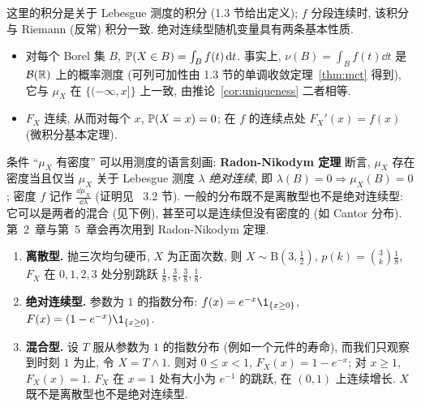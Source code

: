 这里的积分是关于 Lebesgue 测度的积分 (1.3 节给出定义); $f$ 分段连续时, 该积分与 Riemann (反常) 积分一致. 绝对连续型随机变量具有两条基本性质.
\begin{itemize}
\item 对每个 Borel 集 $B$, $\P(X\in B)=\int_B f(t)\dd t$. 事实上, $\nu(B)=\int_B f(t)\dd t$ 是 $\mathcal{B}(\R)$ 上的概率测度 (可列可加性由 1.3 节的单调收敛定理~\ref{thm:mct} 得到), 它与 $\mu_X$ 在 $\{(-\infty,x]\}$ 上一致, 由推论~\ref{cor:uniqueness} 二者相等.
\item $F_X$ 连续, 从而对每个 $x$, $\P(X=x)=0$; 在 $f$ 的连续点处 $F_X'(x)=f(x)$ (微积分基本定理).
\end{itemize}

\begin{remark}
条件 ``$\mu_X$ 有密度'' 可以用测度的语言刻画: \textbf{Radon-Nikodym 定理} 断言, $\mu_X$ 存在密度当且仅当 $\mu_X$ 关于 Lebesgue 测度 $\lambda$ \emph{绝对连续}, 即 $\lambda(B)=0\Rightarrow\mu_X(B)=0$; 密度 $f$ 记作 $\frac{\dd\mu_X}{\dd\lambda}$ (证明见~\cite{folland} 3.2 节). 一般的分布既不是离散型也不是绝对连续型: 它可以是两者的混合 (见下例), 甚至可以是连续但没有密度的 (如 Cantor 分布). 第~2~章与第~5~章会再次用到 Radon-Nikodym 定理.
\end{remark}

\begin{example}\label{ex:cdf-types}
\begin{enumerate}
\item \textbf{离散型.} 抛三次均匀硬币, $X$ 为正面次数, 则 $X\sim\mathrm{B}(3,\frac{1}{2})$, $p(k)=\binom{3}{k}\frac{1}{8}$, $F_X$ 在 $0,1,2,3$ 处分别跳跃 $\frac{1}{8},\frac{3}{8},\frac{3}{8},\frac{1}{8}$.
\item \textbf{绝对连续型.} 参数为 $1$ 的指数分布: $f(x)=e^{-x}\1_{\{x\ge0\}}$, $F(x)=(1-e^{-x})\1_{\{x\ge0\}}$.
\item \textbf{混合型.} 设 $T$ 服从参数为 $1$ 的指数分布 (例如一个元件的寿命), 而我们只观察到时刻 $1$ 为止, 令 $X=T\wedge1$. 则对 $0\le x<1$, $F_X(x)=1-e^{-x}$; 对 $x\ge1$, $F_X(x)=1$. $F_X$ 在 $x=1$ 处有大小为 $e^{-1}$ 的跳跃, 在 $(0,1)$ 上连续增长. $X$ 既不是离散型也不是绝对连续型.
\end{enumerate}
\end{example}

